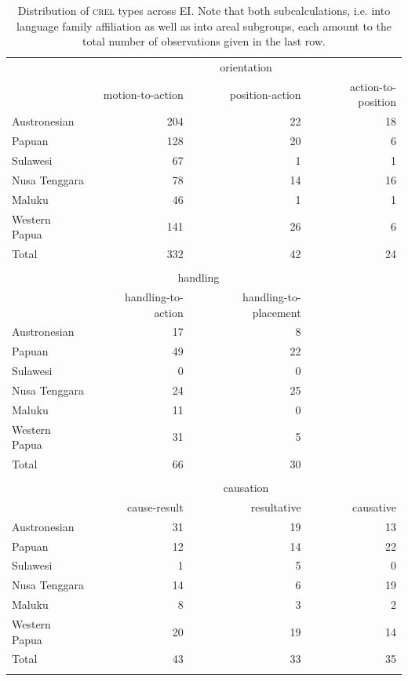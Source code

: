 \begin{table}
\begin{tabular}{lrrr}
  \lsptoprule
&\multicolumn{3}{c}{orientation}\\
 & {motion-to-action} & {position-action} & {action-to-position}\\  
  \midrule
  Austronesian & 204 & 22 & 18\tabularnewline
  Papuan & 128 & 20 &  6\tabularnewline
   \midrule
  Sulawesi & 67 & 1 & 1\tabularnewline
  Nusa Tenggara & 78 & 14 & 16\tabularnewline
  Maluku & 46 & 1 & 1\tabularnewline 
  Western Papua & 141 & 26 & 6 \tabularnewline 
\midrule
Total & 332 & 42 & 24\tabularnewline
\midrule
\\
  \midrule
& \multicolumn{2}{c}{handling} &\\
& {handling-to-action} & {handling-to-placement}\\ 
  \midrule
  Austronesian & 17 & 8 \tabularnewline
  Papuan &  49 & 22 \tabularnewline
   \midrule
  Sulawesi & 0 & 0 \tabularnewline
  Nusa Tenggara & 24 & 25 \tabularnewline
  Maluku & 11 & 0 \tabularnewline 
  Western Papua & 31 & 5  \tabularnewline 
\midrule
Total  & 66 & 30 \tabularnewline
\midrule
\\
  \midrule
&  \multicolumn{3}{c}{causation} \\
 & {cause-result} & {resultative} & {causative} \\  
  \midrule
  Austronesian & 31 & 19 & 13 \tabularnewline
  Papuan & 12 & 14 & 22 \tabularnewline
   \midrule
  Sulawesi & 1 & 5 & 0 \tabularnewline
  Nusa Tenggara & 14 & 6 & 19 \tabularnewline
  Maluku & 8 & 3 & 2 \tabularnewline 
  Western Papua & 20 & 19 & 14 \tabularnewline 
\midrule
Total & 43 & 33 & 35 \tabularnewline
\lspbottomrule
\end{tabular}
\caption[Distribution of \textsc{srel} types across EI]{Distribution of \textsc{crel} types across EI. Note that both subcalculations, i.e. into language family affiliation as well as into areal subgroups, each amount to the total number of observations given in the last row.}
\label{table:SREL_overview}
\end{table}

